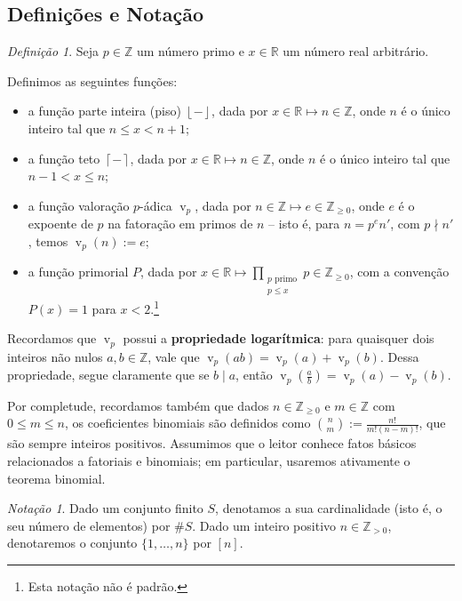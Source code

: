 \documentclass[11pt]{article}
\theoremstyle{remark}
\newtheorem{definition}[theorem]{Definição}
\newtheorem{notation}[theorem]{Notação}
\newcommand{\floor}[1]{\left\lfloor #1 \right\rfloor}
\newcommand{\ceil}[1]{\left\lceil #1 \right\rceil}
\newcommand{\vs}{\vspace{10px}}
\DeclareMathOperator{\val}{v}
\DeclareMathOperator{\vv}{v}
\begin{document}
\vs
\subsection{Definições e Notação}

\begin{definition}
    Seja $p\in \mathbb Z$ um número primo e $x\in \mathbb R$ um número real arbitrário.
    
    Definimos as seguintes funções:
    \begin{itemize}
        \item a função parte inteira (piso) $\floor{-}$, dada por $x\in \mathbb R\mapsto n\in \mathbb Z$, onde $n$ é o único inteiro tal que $n\le x<n+1$;
        \item a função teto $\ceil{-}$, dada por $x\in \mathbb R\mapsto n\in \mathbb Z$, onde $n$ é o único inteiro tal que $n-1<x\le n$;
        \item a função valoração $p$-ádica $\val_p$, dada por $n\in \mathbb Z\mapsto e\in\mathbb Z_{\ge 0}$, onde $e$ é o expoente de $p$ na fatoração em primos de $n$ -- isto é, para $n=p^e n'$, com $p\nmid n'$, temos $\val_p(n):= e$;
        \item a função primorial $P$, dada por $x\in \mathbb R \mapsto \prod\limits_{\substack{p\text{ primo} \\ p\le x}}p\in \mathbb Z_{\ge 0}$, com a convenção $P(x)=1$ para $x<2$.\footnote{Esta notação não é padrão.}
    \end{itemize}
\end{definition}

Recordamos que $\vv_p$ possui a \textbf{propriedade logarítmica}: para quaisquer dois inteiros não nulos $a,b\in \mathbb Z$, vale que $\vv_p(ab) = \vv_p(a)+\vv_p(b)$. Dessa propriedade, segue claramente que se $b\mid a$, então $\val_p(\frac{a}{b})= \val_p(a)-\val_p(b)$.\vs

Por completude, recordamos também que dados $n\in \mathbb Z_{\ge 0}$ e $m\in \mathbb Z$ com $0\le m\le n$, os coeficientes binomiais são definidos como $\binom{n}{m}:= \frac{n!}{m!(n-m)!}$, que são sempre inteiros positivos. Assumimos que o leitor conhece fatos básicos relacionados a fatoriais e binomiais; em particular, usaremos ativamente o teorema binomial.
\vs

\begin{notation}
    Dado um conjunto finito $S$, denotamos a sua cardinalidade (isto é, o seu número de elementos) por $\#S$. Dado um inteiro positivo $n\in\mathbb Z_{>0}$, denotaremos o conjunto $\{1,\ldots, n\}$ por $[n]$. 
\end{notation}
\end{document}

